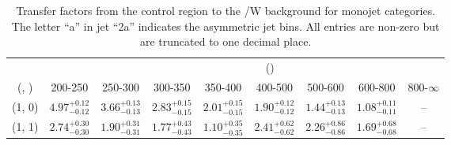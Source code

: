 \begin{table}[h!]
\tiny
\centering
\caption{Transfer factors from the \mmj control region to the \ttbar/W background for monojet categories. The letter ``a'' in jet \eg ``2a''  indicates the asymmetric jet bins. All entries are non-zero but are truncated to one decimal place.\label{tab:tf_mumu_ttw_mono}}
\begin{tabular}
{ccccccccc}
	\hline\hline
&	& \multicolumn{8}{c}{\scalht (\gev)} \\ 
	 (\njet,  \nb) & 200-250 & 250-300 & 300-350 & 350-400 & 400-500 & 500-600 & 600-800 & 800-$\infty$ \\ [0.8ex] 
\hline
	(1, 0) & $4.97^{+ 0.12 }_{- 0.12 }$ & $3.66^{+ 0.13 }_{- 0.13 }$ & $2.83^{+ 0.15 }_{- 0.15 }$ & $2.01^{+ 0.15 }_{- 0.15 }$ & $1.90^{+ 0.12 }_{- 0.12 }$ & $1.44^{+ 0.13 }_{- 0.13 }$ & $1.08^{+ 0.11 }_{- 0.11 }$ & -- \\[0.5ex] 
	(1, 1) & $2.74^{+ 0.30 }_{- 0.30 }$ & $1.90^{+ 0.31 }_{- 0.31 }$ & $1.77^{+ 0.43 }_{- 0.43 }$ & $1.10^{+ 0.35 }_{- 0.35 }$ & $2.41^{+ 0.62 }_{- 0.62 }$ & $2.26^{+ 0.86 }_{- 0.86 }$ & $1.69^{+ 0.68 }_{- 0.68 }$ & -- \\[0.5ex] 
	\hline
	\hline
\end{tabular}
\end{table}

